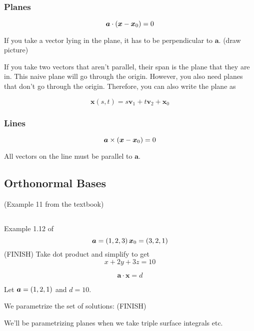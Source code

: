 \documentclass[11pt]{article}
\begin{document}
\subsubsection{Planes}



$$
\bm{a} \cdot \left ( \bm{x} - \bm{x}_0 \right) = 0
$$

If you take a vector lying in the plane, it has to be perpendicular to $\bm{a}$.
(draw picture)

If you take two vectors that aren't parallel, their span is the plane that they are in.
This naive plane will go through the origin.
However, you also need planes that don't go through the origin.
Therefore, you can also write the plane as

$$
\bm{x} (s, t) = s \bm{v}_1 + t \bm{v}_2 + \bm{x}_0
$$

\subsubsection{Lines}

$$
\bm{a} \times \left ( \bm{x} - \bm{x}_0 \right) = 0
$$

All vectors on the line must be parallel to $\bm{a}$.

\subsection{Orthonormal Bases}

(Example 11 from the textbook)

\subsection{}


\begin{example}
  
  Example 1.12 of \cite{carlen}
  $$
  \bm{a} = \left ( 1, 2, 3 \right) \\
  \bm{x}_0 = \left ( 3, 2, 1 \right)
  $$
  (FINISH)
  Take dot product and simplify to get
  $$
  x + 2y + 3z = 10
  $$
\end{example}


\begin{example}
  
  $$
  \bm{a} \cdot \bm{x} = d
  $$

  Let $\bm{a} = \left ( 1, 2, 1  \right)$ and $d=10$.

  We parametrize the set of solutions:
  (FINISH)

  We'll be parametrizing planes when we take triple surface integrals etc.
\end{example}
\end{document}
